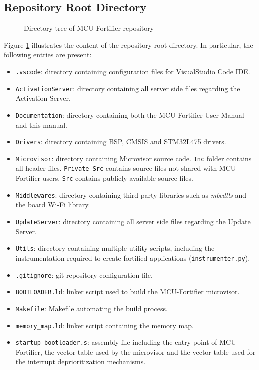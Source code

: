 \documentclass{article}
\begin{document}
\subsection{Repository Root Directory}
\begin{figure}[h]
	\centering
	\begin{minipage}{7cm}
	\end{minipage}
\caption{Directory tree of MCU-Fortifier repository}
\label{fig:repo_tree}
\end{figure}

Figure \ref{fig:repo_tree} illustrates the content of the repository root directory. In particular, the following entries are present:
\begin{itemize}
	\item \verb|.vscode|: directory containing configuration files for VisualStudio Code IDE.
	\item \verb|ActivationServer|: directory containing all server side files regarding the Activation Server.
	\item \verb|Documentation|: directory containing both the MCU-Fortifier User Manual\cite{user_manual} and this manual.
	\item \verb|Drivers|: directory containing BSP, CMSIS and STM32L475 drivers.
	\item \verb|Microvisor|: directory containing Microvisor source code. \verb|Inc| folder contains all header files. \verb|Private-Src| contains source files not shared with MCU-Fortifier users. \verb|Src| contains publicly available source files.
	\item \verb|Middlewares|: directory containing third party libraries such as \textit{mbedtls} and the board Wi-Fi library.
	\item \verb|UpdateServer|: directory containing all server side files regarding the Update Server.
	\item \verb|Utils|: directory containing multiple utility scripts, including the instrumentation required to create fortified applications (\verb|instrumenter.py|).
	\item \verb|.gitignore|: git repository configuration file.
	\item \verb|BOOTLOADER.ld|: linker script used to build the MCU-Fortifier microvisor.
	\item \verb|Makefile|: Makefile automating the build process.
	\item \verb|memory_map.ld|: linker script containing the memory map.
	\item \verb|startup_bootloader.s|: assembly file including the entry point of MCU-Fortifier, the vector table used by the microvisor and the vector table used for the interrupt deprioritization mechanisms.
\end{itemize}
\end{document}
